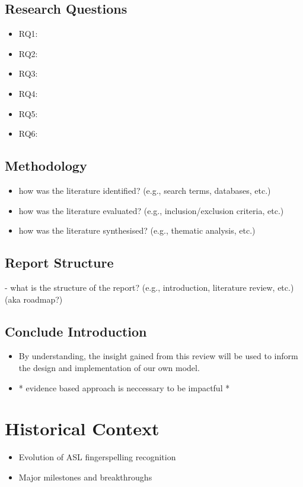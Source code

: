 \subsection{Research Questions}
\begin{itemize}
    \item RQ1:
    \item RQ2:
    \item RQ3:
    \item RQ4:
    \item RQ5:
    \item RQ6:
\end{itemize}

\subsection{Methodology}
\begin{itemize}
    \item how was the literature identified? (e.g., search terms, databases, etc.)
    \item how was the literature evaluated? (e.g., inclusion/exclusion criteria, etc.)
    \item how was the literature synthesised? (e.g., thematic analysis, etc.)
\end{itemize}

\subsection{Report Structure}
- what is the structure of the report? (e.g., introduction, literature review, etc.) (aka roadmap?)

\subsection{Conclude Introduction}

\begin{itemize}
    \item By understanding, the insight gained from this review will be used to inform the design and implementation of our own model.
    \item * evidence based approach is neccessary to be impactful *

\end{itemize}
\section{Historical Context}
\begin{itemize}
    \item Evolution of ASL fingerspelling recognition
    \item Major milestones and breakthroughs
\end{itemize}


